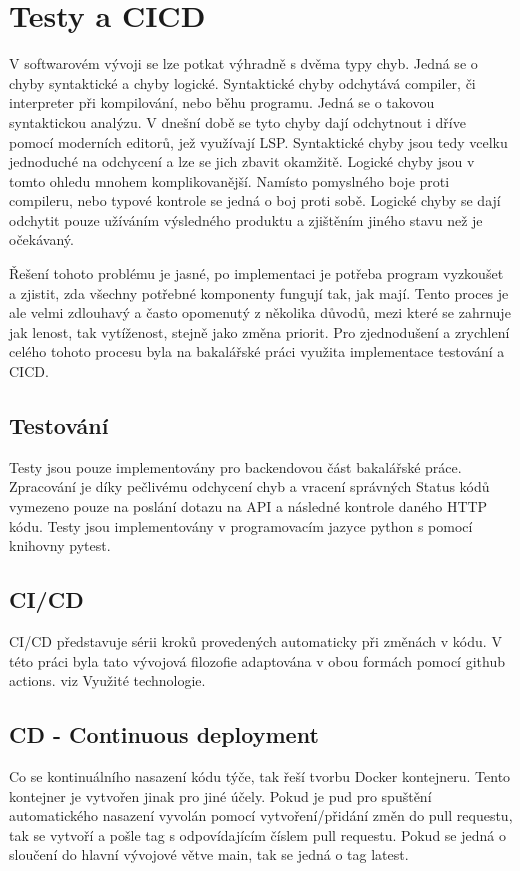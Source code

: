 \chapter{Testy a CICD}
V softwarovém vývoji se lze potkat výhradně s dvěma typy chyb. Jedná se o chyby syntaktické a chyby logické. Syntaktické chyby odchytává compiler, či interpreter při kompilování, nebo běhu programu. Jedná se o takovou syntaktickou analýzu. V dnešní době se tyto chyby dají odchytnout i dříve pomocí moderních editorů, jež využívají LSP. Syntaktické chyby jsou tedy vcelku jednoduché na odchycení a lze se jich zbavit okamžitě. Logické chyby jsou v tomto ohledu mnohem komplikovanější. Namísto pomyslného boje proti compileru, nebo typové kontrole se jedná o boj proti sobě. Logické chyby se dají odchytit pouze užíváním výsledného produktu a zjištěním jiného stavu než je očekávaný. 

Řešení tohoto problému je jasné, po implementaci je potřeba program vyzkoušet a zjistit, zda všechny potřebné komponenty fungují tak, jak mají. Tento proces je ale velmi zdlouhavý a často opomenutý z několika důvodů, mezi které se zahrnuje jak lenost, tak vytíženost, stejně jako změna priorit. Pro zjednodušení a zrychlení celého tohoto procesu byla na bakalářské práci využita implementace testování a CICD.

\section{Testování}
Testy jsou pouze implementovány pro backendovou část bakalářské práce. Zpracování je díky pečlivému odchycení chyb a vracení správných Status kódů vymezeno pouze na poslání dotazu na API a následné kontrole daného HTTP kódu. Testy jsou implementovány v programovacím jazyce python s pomocí knihovny pytest.

\section{CI/CD}
CI/CD představuje sérii kroků provedených automaticky při změnách v kódu. V této práci byla tato vývojová filozofie adaptována v obou formách pomocí github actions. viz Využité technologie.

\section{CD - Continuous deployment}
Co se kontinuálního nasazení kódu týče, tak řeší tvorbu Docker kontejneru. Tento kontejner je vytvořen jinak pro jiné účely. Pokud je pud pro spuštění automatického nasazení vyvolán pomocí vytvoření/přidání změn do pull requestu, tak se vytvoří a pošle tag s odpovídajícím číslem pull requestu. Pokud se jedná o sloučení do hlavní vývojové větve main, tak se jedná o tag latest.

